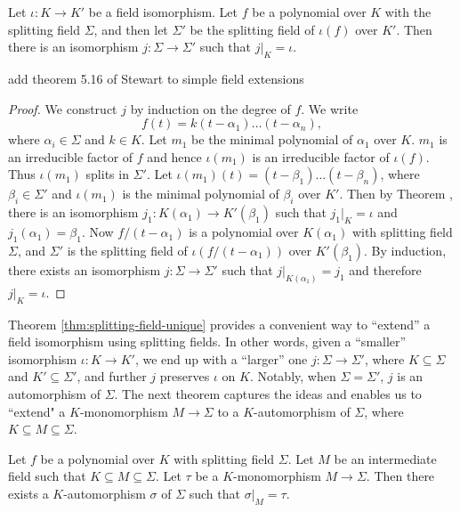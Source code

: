 \begin{theorem} \label{thm:splitting-field-unique}
	Let $\iota: K \to K'$ be a field isomorphism. Let $f$ be a polynomial over $K$ with the splitting field $\Sigma$, and then let $\Sigma'$ be the splitting field of $\iota(f)$ over $K'$. Then there is an isomorphism $j : \Sigma \to \Sigma'$ such that $j | _K = \iota$. 
\end{theorem}
\TODO add theorem 5.16 of Stewart to simple field extensions

\begin{proof}
	We construct $j$ by induction on the degree of $f$. We write $$ f(t) = k (t - \alpha_1) \ldots (t - \alpha_n), $$ where $\alpha_i \in \Sigma$ and $k \in K$. Let $m_1$ be the minimal polynomial of $\alpha_1$ over $K$. $m_1$ is an irreducible factor of $f$ and hence $\iota(m_1)$ is an irreducible factor of $\iota(f)$. Thus $\iota(m_1)$ splits in $\Sigma'$. Let $\iota(m_1)(t) = (t - \beta_1) \ldots (t - \beta_n)$, where $\beta_i \in \Sigma'$ and $\iota(m_1)$ is the minimal polynomial of $\beta_i$ over $K'$. Then by Theorem \TODO, there is an isomorphism $j_1 : K(\alpha_1) \to K'(\beta_1)$ such that $j_1 | _K = \iota$ and $j_1(\alpha_1) = \beta_1$. Now $f / (t - \alpha_1)$ is a polynomial over $K(\alpha_1)$ with splitting field $\Sigma$, and $\Sigma'$ is the splitting field of $\iota(f / (t - \alpha_1))$ over $K'(\beta_1)$. By induction, there exists an isomorphism $j: \Sigma \to \Sigma'$ such that $j | _{K(\alpha_1)} = j_1$ and therefore $j | _K = \iota$. 
\end{proof}

Theorem \ref{thm:splitting-field-unique} provides a convenient way to ``extend'' a field isomorphism using splitting fields. In other words, given a ``smaller'' isomorphism $\iota: K \to K'$, we end up with a ``larger'' one $j: \Sigma \to \Sigma'$, where $K \subseteq \Sigma$ and $K' \subseteq \Sigma'$, and further $j$ preserves $\iota$ on $K$. Notably, when $\Sigma  = \Sigma'$, $j$ is an automorphism of $\Sigma$. The next theorem captures the ideas and enables us to ``extend" a $K$-monomorphism $M \to \Sigma$ to a $K$-automorphism of $\Sigma$, where $K \subseteq M \subseteq \Sigma$. 

\begin{theorem} \label{thm:monomorphism-extend-automorphism}
	Let $f$ be a polynomial over $K$ with splitting field $\Sigma$. Let $M$ be an intermediate field such that $K \subseteq M \subseteq \Sigma$. Let $\tau$ be a $K$-monomorphism $M \to \Sigma$. Then there exists a $K$-automorphism $\sigma$ of $\Sigma$ such that $\sigma | _M = \tau$.  
\end{theorem}

